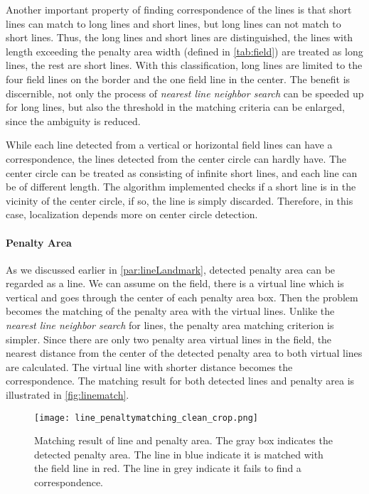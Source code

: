 Another important property of finding correspondence of the lines is that short lines can match to long lines and short lines, but long lines can not match to short lines. Thus, the long lines and short lines are distinguished, the lines with length exceeding the penalty area width (defined in \autoref{tab:field}) are treated as long lines, the rest are short lines. With this classification, long lines are limited to the four field lines on the border and the one field line in the center. The benefit is discernible, not only the process of \textit{nearest line neighbor search} can be speeded up for long lines, but also the threshold in the matching criteria can be enlarged, since the ambiguity is reduced. 

While each line detected from a vertical or horizontal field lines can have a correspondence, the lines detected from the center circle can hardly have. The center circle can be treated as consisting of infinite short lines, and each line can be of different length. The algorithm implemented checks if a short line is in the vicinity of the center circle, if so, the line is simply discarded. Therefore, in this case, localization depends more on center circle detection.




\paragraph{Penalty Area}
As we discussed earlier in \autoref{par:lineLandmark}, detected penalty area can be regarded as a line. We can assume on the field, there is a virtual line which is vertical and goes through the center of each penalty area box. Then the problem becomes the matching of the penalty area with the virtual lines. Unlike the \textit{nearest line neighbor search} for lines, the penalty area matching criterion is simpler. Since there are only two penalty area virtual lines in the field, the nearest distance from the center of the detected penalty area to both virtual lines are calculated. The virtual line with shorter distance becomes the correspondence. The matching result for both detected lines and penalty area is illustrated in \autoref{fig:linematch}.

\begin{figure}[h]
\begin{center}
  \texttt{[image: line\_penaltymatching\_clean\_crop.png]}
\end{center}
\caption[Matching result of line and penalty area]{Matching result of line and penalty area. The gray box indicates the detected penalty area. The line in blue indicate it is matched with the field line in red. The line in grey indicate it fails to find a correspondence.}
\label{fig:linematch}
\end{figure}





